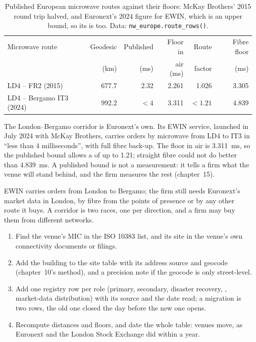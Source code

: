 \begin{table}[ht]
\centering\small
\begin{tabular}{lrrrrr}
\toprule
Microwave route & Geodesic & Published & Floor in & Route & Fibre floor \\
 & (km) & (ms) & air (ms) & factor & (ms) \\
\midrule
LD4 -- FR2 (2015) & 677.7 & 2.32 & 2.261 & 1.026 & 3.305 \\
LD4 -- Bergamo IT3 (2024) & 992.2 & $< 4$ & 3.311 & $< 1.21$ & 4.839 \\
\bottomrule
\end{tabular}
\caption{Published European microwave routes against their floors: McKay Brothers' 2015 round trip halved, and Euronext's 2024 figure for
EWIN, which is an upper bound, so its  is too. Data: \texttt{nw\_europe.route\_rows()}.}\label{tab:nw:the-european-map:routes}
\end{table}

The London--Bergamo corridor is Euronext's own. Its EWIN service, launched in July 2024 with McKay Brothers, carries orders by microwave from
LD4 to IT3 in ``less than 4 milliseconds'', with full fibre back-up. The floor in air is \qty{3.311}{\milli\second}, so the published bound
allows a  of up to 1.21; straight fibre could not do better than \qty{4.839}{\milli\second}. A published bound is not a
measurement: it tells a firm what the venue will stand behind, and the firm measures the rest (chapter~15).

\begin{remark}\label{rem:nw:the-european-map:direction}
EWIN carries orders from London to Bergamo; the firm still needs Euronext's market data in London, by fibre from the points of presence or by
any other route it buys. A corridor is two races, one per direction, and a firm may buy them from different networks.
\end{remark}

\begin{method}\label{met:nw:the-european-map:add}
\begin{enumerate}
\item Find the venue's MIC in the ISO 10383 list, and its site in the venue's own connectivity documents or filings.
\item Add the building to the site table with its address source and geocode (chapter~10's method), and a precision note if the geocode is
  only street-level.
\item Add one registry row per role (primary, secondary, disaster recovery, , market-data distribution) with its source
  and the date read; a migration is two rows, the old one closed the day before the new one opens.
\item Recompute distances and floors, and date the whole table: venues move, as Euronext and the London Stock Exchange did within a year.
\end{enumerate}
\end{method}

